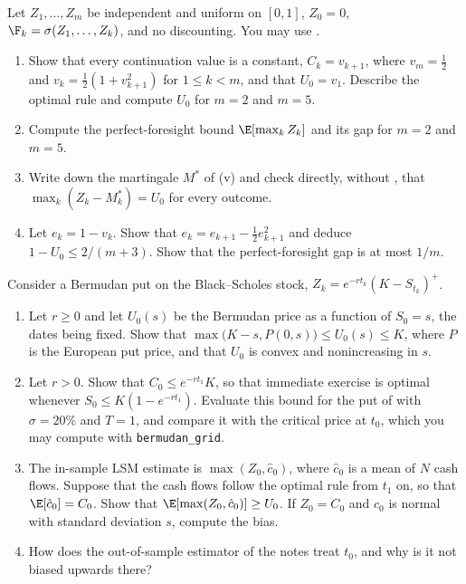 
\begin{exercise}\label{ex:am-secretary}
\easy Let $Z_1,\dots,Z_m$ be independent and uniform on $[0,1]$, $Z_0=0$,
$\F_k=\sigma(Z_1,\dots,Z_k)$, and no discounting. You may use .
\begin{enumerate}[label=(\alph*)]
  \item Show that every continuation value is a constant, $C_k=v_{k+1}$, where $v_m=\frac12$ and
    $v_k=\frac12(1+v_{k+1}^2)$ for $1\le k<m$, and that $U_0=v_1$. Describe the optimal rule
    and compute $U_0$ for $m=2$ and $m=5$.
  \item Compute the perfect-foresight bound $\E[\max_kZ_k]$ and its gap for $m=2$ and $m=5$.
  \item Write down the martingale $M^*$ of (v) and check directly, without
    , that $\max_k(Z_k-M^*_k)=U_0$ for every outcome.
  \item Let $e_k=1-v_k$. Show that $e_k=e_{k+1}-\frac12e_{k+1}^2$ and deduce
    $1-U_0\le2/(m+3)$. Show that the perfect-foresight gap is at most $1/m$.
\end{enumerate}
\end{exercise}

\begin{exercise}\label{ex:am-exercise-now}
\easy Consider a Bermudan put on the Black--Scholes stock, $Z_k=e^{-rt_k}(K-S_{t_k})^+$.
\begin{enumerate}[label=(\alph*)]
  \item Let $r\ge0$ and let $U_0(s)$ be the Bermudan price as a function of $S_0=s$, the
    dates being fixed. Show that $\max\big(K-s,P(0,s)\big)\le U_0(s)\le K$, where $P$ is the
    European put price, and that $U_0$ is convex and nonincreasing in $s$.
  \item Let $r>0$. Show that $C_0\le e^{-rt_1}K$, so that immediate exercise is optimal
    whenever $S_0\le K(1-e^{-rt_1})$. Evaluate this bound for the put of
     with $\sigma=20\%$ and $T=1$, and compare it with the critical price
    at $t_0$, which you may compute with \texttt{bermudan\_grid}.
  \item The in-sample LSM estimate is $\max(Z_0,\hat c_0)$, where $\hat c_0$ is a mean of $N$
    cash flows. Suppose that the cash flows follow the optimal rule from $t_1$ on, so that
    $\E[\hat c_0]=C_0$. Show that $\E[\max(Z_0,\hat c_0)]\ge U_0$. If $Z_0=C_0$ and $\hat c_0$
    is normal with standard deviation $s$, compute the bias.
  \item How does the out-of-sample estimator of the notes treat $t_0$, and why is it not
    biased upwards there?
\end{enumerate}
\end{exercise}


